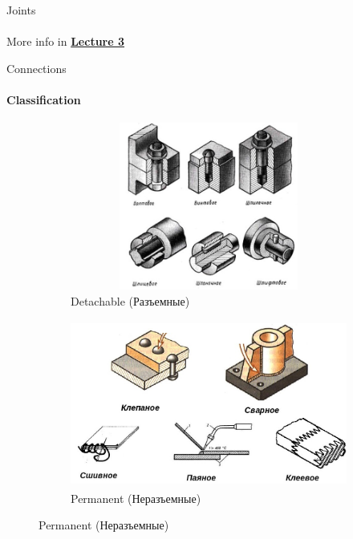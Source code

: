 \documentclass[aspectratio=169]{beamer}
\begin{document}
\begin{frame}[c]{Joints}
\framesubtitle{}
    \centering \LARGE More info in \textbf{\href{https://github.com/Lupasic/IME_Inno_2023/blob/main/lectures/3/IME_lec3.pdf}{Lecture 3}}
\end{frame}

\begin{frame}[t]{Connections}
\framesubtitle{Classification}
    \vspace{-0.7cm}
    \begin{figure}[H]
        \begin{subfigure}{0.48\textwidth}
            \centering\includegraphics[height=5.5cm,width=1\textwidth,keepaspectratio]{detach.jpg}
            \caption*{Detachable (Разъемные)}
            \label{fig:detach.jpg}
        \end{subfigure}
        \begin{subfigure}{0.48\textwidth}
            \centering\includegraphics[height=5.5cm,width=1\textwidth,keepaspectratio]{fixed.jpg}
            \caption*{Permanent (Неразъемные)}
            \label{fig:fixed.jpg}
        \end{subfigure}
    \end{figure}
\end{frame}
\end{document}
